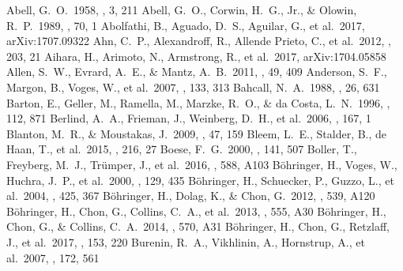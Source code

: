 \documentclass[iop, apj]{emulateapj}
\begin{document}
\begin{thebibliography}{}
 Abell, G.~O.\ 1958, \apjs, 3, 211 
 Abell, G.~O., Corwin, H.~G., Jr., \& Olowin, R.~P.\ 1989, \apjs, 70, 1  
 Abolfathi, B., Aguado, D.~S., Aguilar, G., et al.\ 2017, arXiv:1707.09322  
 Ahn, C.~P., Alexandroff, R., Allende Prieto, C., et al.\ 2012, \apjs, 203, 21 
 Aihara, H., Arimoto, N., Armstrong, R., et al.\ 2017, arXiv:1704.05858 
 Allen, S.~W., Evrard, A.~E., \& Mantz, A.~B.\ 2011, \araa, 49, 409 
 Anderson, S.~F., Margon, B., Voges, W., et al.\ 2007, \aj, 133, 313 
 Bahcall, N.~A.\ 1988, \araa, 26, 631   
 Barton, E., Geller, M., Ramella, M., Marzke, R.~O., \& da Costa, L.~N.\ 1996, \aj, 112, 871
 Berlind, A.~A., Frieman, J., Weinberg, D.~H., et al.\ 2006, \apjs, 167, 1 
 Blanton, M.~R., \& Moustakas, J.\ 2009, \araa, 47, 159  
 Bleem, L.~E., Stalder, B., de Haan, T., et al.\ 2015, \apjs, 216, 27    
 Boese, F.~G.\ 2000, \aaps, 141, 507  
 Boller, T., Freyberg, M.~J., Tr{\"u}mper, J., et al.\ 2016, \aap, 588, A103 
 B{\"o}hringer, H., Voges, W., Huchra, J.~P., et al.\ 2000, \apjs, 129, 435 
 B{\"o}hringer, H., Schuecker, P., Guzzo, L., et al.\ 2004, \aap, 425, 367
 B{\"o}hringer, H., Dolag, K., \& Chon, G.\ 2012, \aap, 539, A120    
 B{\"o}hringer, H., Chon, G., Collins, C.~A., et al.\ 2013, \aap, 555, A30 
 B{\"o}hringer, H., Chon, G., \& Collins, C.~A.\ 2014, \aap, 570, A31  
 B{\"o}hringer, H., Chon, G., Retzlaff, J., et al.\ 2017, \aj, 153, 220    
 Burenin, R.~A., Vikhlinin, A., Hornstrup, A., et al.\ 2007, \apjs, 172, 561  

\end{thebibliography}
\end{document}
